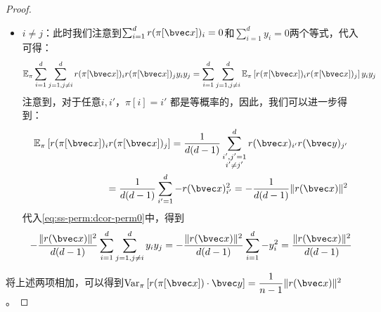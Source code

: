 \begin{proof}
\begin{itemize}
    \item $i \ne j$：此时我们注意到$\sum_{i=1}^d r(\pi[\bvec x])_i = 0$和$\sum_{i=1}^d y_i = 0$两个等式，代入可得：
    \begin{equation}
    \label{eq:ss-perm:dcor-perm0}
        \mathbb E_\pi \sum_{i=1}^d  \sum_{j = 1, j\ne i}^d r(\pi[\bvec x])_i r(\pi[\bvec x])_j y_i y_j = \sum_{i=1}^d  \sum_{j = 1, j\ne i}^d \mathbb E_\pi \left[ r(\pi[\bvec x])_i r(\pi[\bvec x])_j \right] y_i y_j
    \end{equation}
    注意到，对于任意$i, i'$，$\pi[i] = i'$ 都是等概率的，因此，我们可以进一步得到：
    \begin{equation}
    \begin{split}
        \mathbb E_\pi \left[ r(\pi[\bvec x])_i r(\pi[\bvec x])_j \right] = \dfrac{1}{d(d-1)}\sum_{\substack{i',j'=1\\i'\ne j'}}^d r(\bvec x)_{i'} r(\bvec y)_{j'} \\
        = \dfrac{1}{d(d-1)}\sum_{i'=1}^d -r(\bvec x)_{i'}^2  = -\dfrac{1}{d(d-1)}\Vert r(\bvec x) \Vert^2
    \end{split}
    \end{equation}
    代入\autoref{eq:ss-perm:dcor-perm0}中，得到
    \begin{equation}
        -\dfrac{\Vert r(\bvec x) \Vert^2 }{d(d-1)}\sum_{i=1}^d  \sum_{j = 1, j\ne i}^d y_i y_j = -\dfrac{\Vert r(\bvec x) \Vert^2 }{d(d-1)}\sum_{i=1}^d -y_i^2 = \dfrac{\Vert r(\bvec x) \Vert^2 }{d(d-1)}
    \end{equation}
\end{itemize}
将上述两项相加，可以得到$\textnormal{Var}_\pi \left[ r(\pi[\bvec x])\cdot \bvec y \right] = \dfrac{1}{n - 1} \Vert r(\bvec x) \Vert^2$。
\end{proof}

